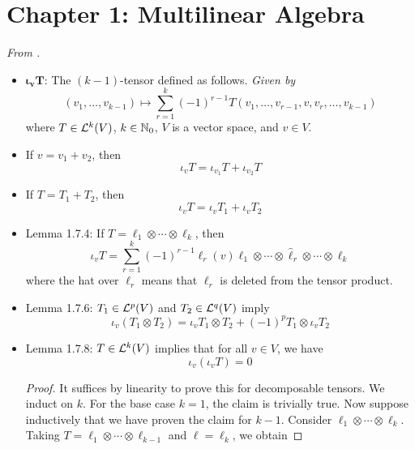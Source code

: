 \documentclass[../notes.tex]{subfiles}
\begin{document}
\section{Chapter 1: Multilinear Algebra}
\emph{From \textcite{bib:DifferentialForms}.}
\begin{itemize}
    \item {}$\bm{\iota_vT}$: The $(k-1)$-tensor defined as follows. \emph{Given by}
    \begin{equation*}
        (v_1,\dots,v_{k-1}) \mapsto \sum_{r=1}^k(-1)^{r-1}T(v_1,\dots,v_{r-1},v,v_r,\dots,v_{k-1})
    \end{equation*}
    where $T\in\lin[k]{V}$, $k\in\N_0$, $V$ is a vector space, and $v\in V$.
    \item If $v=v_1+v_2$, then
    \begin{equation*}
        \iota_vT = \iota_{v_1}T+\iota_{v_2}T
    \end{equation*}
    \item If $T=T_1+T_2$, then
    \begin{equation*}
        \iota_vT = \iota_vT_1+\iota_vT_2
    \end{equation*}
    \item Lemma 1.7.4: If $T=\ell_1\otimes\cdots\otimes\ell_k$, then
    \begin{equation*}
        \iota_vT = \sum_{r=1}^k(-1)^{r-1}\ell_r(v)\ell_1\otimes\cdots\otimes\hat{\ell}_r\otimes\cdots\otimes\ell_k
    \end{equation*}
    where the hat over $\ell_r$ means that $\ell_r$ is deleted from the tensor product.
    \item Lemma 1.7.6: $T_1\in\lin[p]{V}$ and $T_2\in\lin[q]{V}$ imply
    \begin{equation*}
        \iota_v(T_1\otimes T_2) = \iota_vT_1\otimes T_2+(-1)^pT_1\otimes\iota_vT_2
    \end{equation*}
    \item Lemma 1.7.8: $T\in\lin[k]{V}$ implies that for all $v\in V$, we have
    \begin{equation*}
        \iota_v(\iota_vT) = 0
    \end{equation*}
    \begin{proof}
        It suffices by linearity to prove this for decomposable tensors. We induct on $k$. For the base case $k=1$, the claim is trivially true. Now suppose inductively that we have proven the claim for $k-1$. Consider $\ell_1\otimes\cdots\otimes\ell_k$. Taking $T=\ell_1\otimes\cdots\otimes\ell_{k-1}$ and $\ell=\ell_k$, we obtain

\end{proof}
\end{itemize}
\end{document}
